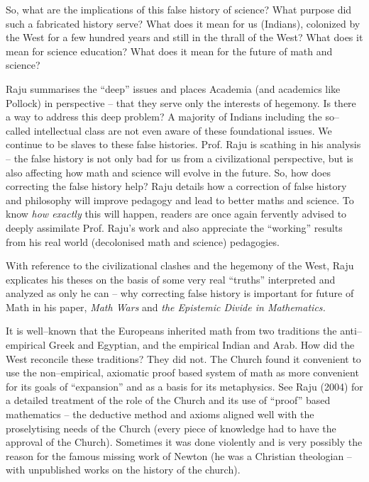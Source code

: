 So, what are the implications of this false history of science? What purpose did such a fabricated history serve? What does it mean for us (Indians), colonized by the West for a few hundred years and still in the thrall of the West? What does it mean for science education? What does it mean for the future of math and science?

Raju summarises the “deep” issues and places Academia (and academics like Pollock) in perspective – that they serve only the interests of hegemony. Is there a way to address this deep problem? A majority of Indians including the so–called intellectual class are not even aware of these foundational issues. We continue to be slaves to these false histories. Prof. Raju is scathing in his analysis – the false history is not only bad for us from a civilizational perspective, but is also affecting how math and science will evolve in the future. So, how does correcting the false history help? Raju details how a correction of false history and philosophy will improve pedagogy and lead to better maths and science. To know \textit{how exactly} this will happen, readers are once again fervently advised to deeply assimilate Prof. Raju’s work and also appreciate the “working” results from his real world (decolonised math and science) pedagogies.

With reference to the civilizational clashes and the hegemony of the West, Raju explicates his theses on the basis of some very real “truths” interpreted and analyzed as only he can – why correcting false history is important for future of Math in his paper, \textit{Math Wars} and \textit{the Epistemic Divide in Mathematics.}

It is well–known that the Europeans inherited math from two traditions the anti–empirical Greek and Egyptian, and the empirical Indian and Arab. How did the West reconcile these traditions? They did not. The Church found it convenient to use the non–empirical, axiomatic proof based system of math as more convenient for its goals of “expansion” and as a basis for its metaphysics. See Raju (2004) for a detailed treatment of the role of the Church and its use of “proof” based mathematics – the deductive method and axioms aligned well with the proselytising needs of the Church (every piece of knowledge had to have the approval of the Church). Sometimes it was done violently and is very possibly the reason for the famous missing work of Newton (he was a Christian theologian – with unpublished works on the history of the church).

